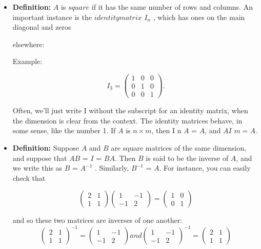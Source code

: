 \documentclass{book}
\begin{document}
\begin{itemize}
\item \textbf{Definition:} $A$ is $square$ if it has the same number of rows and columns. An important instance is the $identity matrix$ $I_n$ , which has ones on the main diagonal and zeros

elsewhere:

Example:

						$$ I_3 = \begin{pmatrix} 1 & 0 & 0 \\
0 & 1 & 0 \\
0 & 0 & 1\end{pmatrix}. $$

Often, we\rq ll just write I without the subscript for an identity matrix, when the dimension is clear from the context. The identity matrices behave, in some sense, like the number 1. If $A$ is $n \times m$, then I n $A$ = $A$, and $AI$ $m = A$.

\item \textbf{Definition:} Suppose $A$ and $B$ are square matrices of the same dimension, and suppose that $AB$ = $I$ = $BA$. Then $B$ is said to be the inverse of $A$, and we write this as $B$ = $A^{-1}$ . Similarly, $B^{-1}$ = $A$. For instance, you can easily check that

$$\begin{pmatrix}2 & 1 \\ 1 & 1 \end{pmatrix} \begin{pmatrix} 1 & -1 \\ -1 & 2\end{pmatrix} = \begin{pmatrix} 1 & 0 \\ 0 & 1\end{pmatrix}  $$

and so these two matrices are inverses of one another:
$$\begin{pmatrix} 2 & 1 \\ 1 & 1\end{pmatrix}^{-1}  = \begin{pmatrix} 1 & -1 \\ -1 & 2  \end{pmatrix}  and \begin{pmatrix} 1 & -1 \\ -1 & 2\end{pmatrix}^{-1} = \begin{pmatrix}2 & 1 \\ 1 & 1 \end{pmatrix} $$


\end{itemize}
\end{document}
